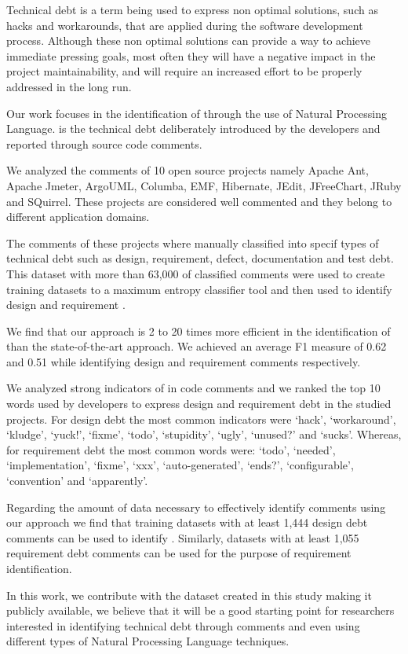 Technical debt is a term being used to express non optimal solutions, such as hacks and workarounds, that are applied during the software development process. Although these non optimal solutions can provide a way to achieve immediate pressing goals, most often they will have a negative impact in the project maintainability, and will require an increased effort to be properly addressed in the long run. 

Our work focuses in the identification of \SATD through the use of Natural Processing Language. \SATD is the technical debt deliberately introduced by the developers and reported through source code comments.

We analyzed the comments of 10 open source projects namely Apache Ant, Apache Jmeter, ArgoUML, Columba, EMF, Hibernate, JEdit, JFreeChart, JRuby and SQuirrel. These projects are considered well commented and they belong to different application domains.

The comments of these projects where manually classified into specif types of technical debt such as design, requirement, defect, documentation and test debt. This dataset with more than 63,000 of classified comments were used to create training datasets to a maximum entropy classifier tool and then used to identify  design and requirement \SATD.

We find that our approach is 2 to 20 times more efficient in the identification of \SATD than the state-of-the-art approach. We achieved an average F1 measure of 0.62 and 0.51 while identifying design and requirement \SATD comments respectively. 

We analyzed strong indicators of \SATD in code comments and we ranked the top 10 words used by developers to express design and requirement debt in the studied projects. For design debt the most common indicators were `hack', `workaround', `kludge', `yuck!', `fixme', `todo', `stupidity', `ugly', `unused?' and `sucks'. Whereas, for requirement debt the most common words were: `todo', `needed', `implementation', `fixme', `xxx', `auto-generated', `ends?', `configurable', `convention' and `apparently'.
 
Regarding the amount of data necessary to effectively identify \SATD comments using our approach we find that training datasets with at least 1,444 design debt comments can be used to identify \SATD. Similarly, datasets with at least 1,055 requirement debt comments can be used for the purpose of requirement \SATD identification. 

In this work, we contribute with the dataset created in this study making it publicly available, we believe that it will be a good starting point for researchers interested in identifying technical debt through comments and even using different types of Natural Processing Language techniques. 

